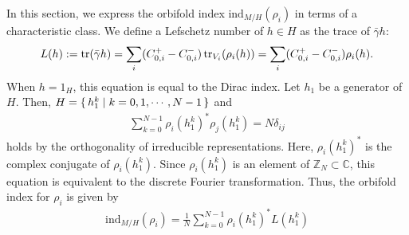 \documentclass[11pt]{article}
\newcommand{\fix}[1]{\textcolor{red}{[#1]}}
\newcommand{\Lef}{Lefschetz }
\begin{document}




In this section, we express the orbifold index $\text{ind}_{M/H} ( \rho_i)$ in terms of a characteristic class. We define a \Lef number of $h \in H$ as the trace of $\bar{\gamma} h$:
\begin{align}\label{eq:DefOfLef}
    L(h):=\tr( \bar{\gamma} h)= \sum_{i}(C_{0,i}^+ - C_{0,i}^-) \tr_{V_i} (\rho_i(h))= \sum_{i}(C_{0,i}^+ - C_{0,i}^-) \rho_i(h).
\end{align}
When $h=1_H$, this equation is equal to the Dirac index. Let $h_1$ be a generator of $H$. Then, $H= \set{h_1^k| k=0,1,\cdots ,N-1}$ and 
\begin{align}
    \sum_{k=0}^{N-1} \rho_i(h_1^k )^\ast \rho_j(h_1^k)= N \delta_{ij}
\end{align} 
holds by the orthogonality of irreducible representations. Here, $\rho_i(h_1^k )^\ast$ is the complex conjugate of $\rho_i(h_1^k )$. Since $\rho_i(h_1^k )$ is an element of $\mathbb{Z}_N \subset \mathbb{C}$, this equation is equivalent to the discrete Fourier transformation. Thus, the orbifold index for $\rho_i$ is given by
\begin{align}
    \text{ind}_{M/H} ( \rho_i)=  \frac{1}{N} \sum_{k=0}^{N-1} \rho_i(h_1^k )^\ast L(h_1^k) \label{eq:FT of LEf number} %
\end{align}

\end{document}
